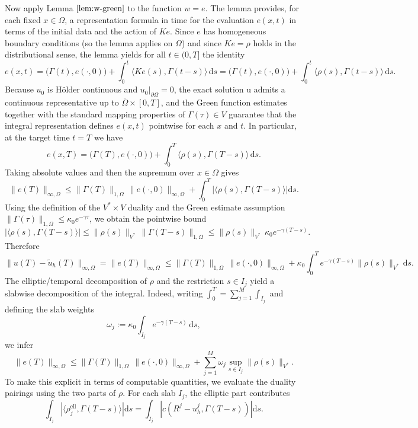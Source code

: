 \documentclass{article}
\begin{document}
Now apply Lemma \(\ref{lem:w-green}\) to the function \(w=e\). The lemma provides, for each fixed \(x\in\Omega\), a representation formula in time for the evaluation \(e(x,t)\) in terms of the initial data and the action of \(Ke\). Since \(e\) has homogeneous boundary conditions (so the lemma applies on \(\Omega\)) and since \(Ke=\rho\) holds in the distributional sense, the lemma yields for all \(t\in(0,T]\) the identity
\[
e(x,t)=\big(\Gamma(t),e(\cdot,0)\big)+\int_0^t \big\langle Ke(s),\Gamma(t-s)\big\rangle\,\mathrm ds
=\big(\Gamma(t),e(\cdot,0)\big)+\int_0^t \big\langle \rho(s),\Gamma(t-s)\big\rangle\,\mathrm ds.
\]
Because \(u_0\) is Hölder continuous and \(u_0|_{\partial\Omega}=0\), the exact solution u admits a continuous representative up to \(\bar\Omega\times[0,T]\), and the Green function estimates together with the standard mapping properties of \(\Gamma(\tau)\in V\) guarantee that the integral representation defines \(e(x,t)\) pointwise for each \(x\) and \(t\). In particular, at the target time \(t=T\) we have
\[
e(x,T)=\big(\Gamma(T),e(\cdot,0)\big)+\int_0^T \big\langle \rho(s),\Gamma(T-s)\big\rangle\,\mathrm ds.
\]
Taking absolute values and then the supremum over \(x\in\Omega\) gives
\[
\|e(T)\|_{\infty,\Omega}\le \big\|\Gamma(T)\big\|_{1,\Omega}\,\|e(\cdot,0)\|_{\infty,\Omega}
+\int_0^T \left|\big\langle \rho(s),\Gamma(T-s)\big\rangle\right|\mathrm ds.
\]
Using the definition of the \(V^*\times V\) duality and the Green estimate assumption \(\|\Gamma(\tau)\|_{1,\Omega}\le \kappa_0 e^{-\gamma\tau}\), we obtain the pointwise bound
\[
\left|\big\langle \rho(s),\Gamma(T-s)\big\rangle\right|\le \|\rho(s)\|_{V^*}\,\|\Gamma(T-s)\|_{1,\Omega}\le \|\rho(s)\|_{V^*}\,\kappa_0 e^{-\gamma(T-s)}.
\]
Therefore
\[
\|u(T)-\tilde u_h(T)\|_{\infty,\Omega}=\|e(T)\|_{\infty,\Omega}
\le \big\|\Gamma(T)\big\|_{1,\Omega}\,\|e(\cdot,0)\|_{\infty,\Omega}
+\kappa_0\int_0^T e^{-\gamma(T-s)}\|\rho(s)\|_{V^*}\,\mathrm ds.
\]
The elliptic/temporal decomposition of \(\rho\) and the restriction \(s\in I_j\) yield a slabwise decomposition of the integral. Indeed, writing \(\int_0^T = \sum_{j=1}^M\int_{I_j}\) and defining the slab weights
\[
\omega_j:=\kappa_0\int_{I_j} e^{-\gamma(T-s)}\,\mathrm ds,
\]
we infer
\[
\|e(T)\|_{\infty,\Omega}\le \big\|\Gamma(T)\big\|_{1,\Omega}\,\|e(\cdot,0)\|_{\infty,\Omega}
+\sum_{j=1}^M \omega_j\sup_{s\in I_j}\|\rho(s)\|_{V^*}.
\]
To make this explicit in terms of computable quantities, we evaluate the duality pairings using the two parts of \(\rho\). For each slab \(I_j\), the elliptic part contributes
\[
\int_{I_j}\left|\big\langle \rho_j^{\mathrm{ell}},\Gamma(T-s)\big\rangle\right|\mathrm ds
=\int_{I_j}\left|c(R^j-u_h^j,\Gamma(T-s))\right|\mathrm ds.
\]
\end{document}
